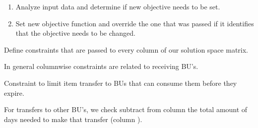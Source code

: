 \documentclass[letterpaper,10pt,english]{sphinxmanual}
\begin{document}
\begin{fulllineitems}
\begin{fulllineitems}
\begin{enumerate}
%
\item {} 
Analyze input data and determine if new objective needs to be set.

\item {} 
Set new objective function and override the one that was passed if it identifies that the objective needs to be changed.

\end{enumerate}

\end{fulllineitems}


\begin{fulllineitems}
\label{\detokenize{source/optimization.model:optimization.model.optimizer.OptimizationModel._column_constraints}}
Define constraints that are passed to every column of our solution space matrix.

In general column\sphinxhyphen{}wise constraints are related to receiving BU’s.

\end{fulllineitems}


\begin{fulllineitems}
\label{\detokenize{source/optimization.model:optimization.model.optimizer.OptimizationModel._consume_before_expire_constraint}}
Constraint to limit item transfer to BUs that can consume them before they expire.

For transfers to other BU’s, we check subtract from column  the total amount of
days needed to make that transfer (column ).


\end{fulllineitems}
\end{fulllineitems}
\end{document}
